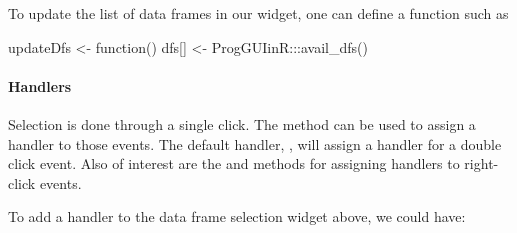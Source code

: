 To update the list of data frames in our  widget, one can define a function such as
\begin{Schunk}
\begin{Sinput}
 updateDfs <- function() {
   dfs[] <- ProgGUIinR:::avail_dfs()
 }
\end{Sinput}
\end{Schunk}


\paragraph{Handlers}
Selection is done through a single click. The 
method  can be used to assign a handler to those events. The default
handler, , will assign a
handler for a double click event. Also of interest are the
 and
 methods for assigning handlers
to right-click events.


To add a handler to the data frame selection widget above, we could have:
\begin{Schunk}
\end{Schunk}

